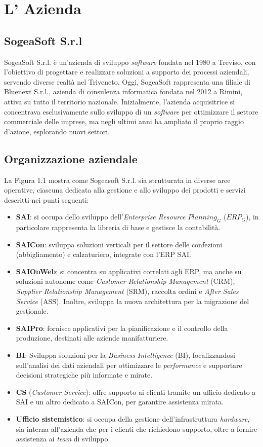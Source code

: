 \chapter{L' Azienda}
    \section{SogeaSoft S.r.l}
    SogeaSoft S.r.l. è un'azienda di sviluppo \textit{software} fondata nel 1980 a Treviso, con l'obiettivo di progettare e realizzare soluzioni a supporto dei processi aziendali, servendo diverse realtà nel Triveneto.
    Oggi, SogeaSoft rappresenta una filiale di Bluenext S.r.l., azienda di consulenza informatica fondata nel 2012 a Rimini, attiva su tutto il territorio nazionale. Inizialmente, l'azienda acquisitrice si concentrava esclusivamente sullo sviluppo di un \textit{software} per ottimizzare il settore commerciale delle imprese, ma negli ultimi anni ha ampliato il proprio raggio d'azione, esplorando nuovi settori.
    
    \section{Organizzazione aziendale}
    La Figura 1.1 mostra come Sogeasoft S.r.l. sia strutturata in diverse aree operative, ciascuna dedicata alla gestione e allo sviluppo dei prodotti e servizi descritti nei punti seguenti: 
    
    \begin{itemize}
        \item \textbf{SAI}: si occupa dello sviluppo dell'\textit{Enterprise Resource $Planning_G$} ($ERP_G$), in particolare rappresenta la libreria di base e gestisce la contabilità.
        \item \textbf{SAICon}: sviluppa soluzioni verticali per il settore delle confezioni (abbigliamento) e calzaturiero, integrate con l'ERP SAI.
        \item \textbf{SAIOnWeb}: si concentra su applicativi correlati agli ERP, ma anche su soluzioni autonome come \textit{Customer Relationship Management} (CRM), \textit{Supplier Relationship Management} (SRM), raccolta ordini e \textit{After Sales Service} (ASS). Inoltre, sviluppa la nuova architettura per la migrazione del gestionale.
        \item \textbf{SAIPro}: fornisce applicativi per la pianificazione e il controllo della produzione, destinati alle aziende manifatturiere.
        \item \textbf{BI}: Sviluppa soluzioni per la \textit{Business Intelligence} (BI), focalizzandosi sull'analisi dei dati aziendali per ottimizzare le \textit{performance} e supportare decisioni strategiche più informate e mirate. 
        \item \textbf{CS} (\textit{Customer Service}): offre supporto ai clienti tramite un ufficio dedicato a SAI e un altro dedicato a SAICon, per garantire assistenza mirata.
        \item \textbf{Ufficio sistemistico}: si occupa della gestione dell'infrastruttura \textit{hardware}, sia interna all'azienda che per i clienti che richiedono supporto, oltre a fornire assistenza ai \textit{team} di sviluppo.
    \end{itemize}
    
